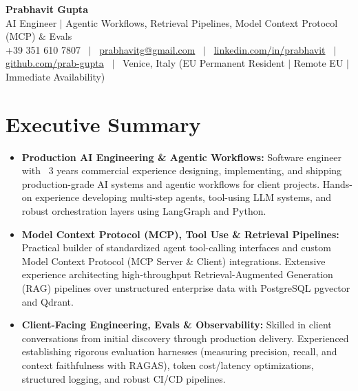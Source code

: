 \documentclass[a4paper,10pt]{article}
\begin{document}
\begin{minipage}[c]{0.80\textwidth}
  {\Huge\bfseries Prabhavit Gupta}\\[3pt]
  {\color{accent}\large AI Engineer $\vert$ Agentic Workflows, Retrieval Pipelines, Model Context Protocol (MCP) $\&$ Evals}\\[6pt]
  {\footnotesize +39 351 610 7807 ~$\vert$~
  \href{mailto:prabhavitg@gmail.com}{prabhavitg@gmail.com} ~$\vert$~
  \href{https://www.linkedin.com/in/prabhavit/}{linkedin.com/in/prabhavit} ~$\vert$~
  \href{https://github.com/prab-gupta}{github.com/prab-gupta} ~$\vert$~
  Venice, Italy (EU Permanent Resident $\vert$ Remote EU $\vert$ Immediate Availability)}
\end{minipage}\hfill

\vspace{6pt}

\section{Executive Summary}
\begin{itemize}
  \item \textbf{Production AI Engineering \& Agentic Workflows:} Software engineer with ~3 years commercial experience designing, implementing, and shipping production-grade AI systems and agentic workflows for client projects. Hands-on experience developing multi-step agents, tool-using LLM systems, and robust orchestration layers using LangGraph and Python.
  \item \textbf{Model Context Protocol (MCP), Tool Use \& Retrieval Pipelines:} Practical builder of standardized agent tool-calling interfaces and custom Model Context Protocol (MCP Server \& Client) integrations. Extensive experience architecting high-throughput Retrieval-Augmented Generation (RAG) pipelines over unstructured enterprise data with PostgreSQL pgvector and Qdrant.
  \item \textbf{Client-Facing Engineering, Evals \& Observability:} Skilled in client conversations from initial discovery through production delivery. Experienced establishing rigorous evaluation harnesses (measuring precision, recall, and context faithfulness with RAGAS), token cost/latency optimizations, structured logging, and robust CI/CD pipelines.
\end{itemize}

\end{document}
